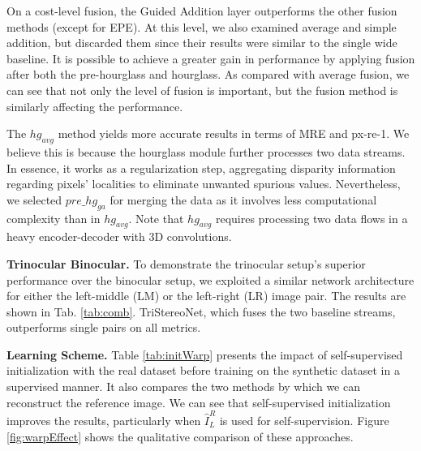 \documentclass[10pt,twocolumn,letterpaper]{article}
\begin{document}
On a cost-level fusion, the Guided Addition layer outperforms the other fusion methods (except for EPE). At this level, we also examined average and simple addition, but discarded them since their results were similar to the single wide baseline. It is possible to achieve a greater gain in performance by applying fusion after both the pre-hourglass and hourglass. As compared with average fusion, we can see that not only the level of fusion is important, but the fusion method is similarly affecting the performance.

The ${hg_{avg}}$ method yields more accurate results in terms of MRE and px-re-1. We believe this is because the hourglass module further processes two data streams. In essence, it works as a regularization step, aggregating disparity information regarding pixels' localities to eliminate unwanted spurious values. Nevertheless, we selected ${pre\_hg_{ga}}$ for merging the data as it involves less computational complexity than in ${hg_{avg}}$. Note that ${hg_{avg}}$ requires processing two data flows in a heavy encoder-decoder with 3D convolutions.

\noindent\textbf{Trinocular \vs Binocular.} To demonstrate the trinocular setup's superior performance over the binocular setup, we exploited a similar network architecture for either the left-middle (LM) or the left-right (LR) image pair. The results are shown in Tab. \ref{tab:comb}. TriStereoNet, which fuses the two baseline streams, outperforms single pairs on all metrics. 

\noindent\textbf{Learning Scheme.} Table \ref{tab:initWarp} presents the impact of self-supervised initialization with the real dataset before training on the synthetic dataset in a supervised manner. It also compares the two methods by which we can reconstruct the reference image. We can see that self-supervised initialization improves the results, particularly when $\hat{I}_L^R$ is used for self-supervision. Figure \ref{fig:warpEffect} shows the qualitative comparison of these approaches.
\end{document}
